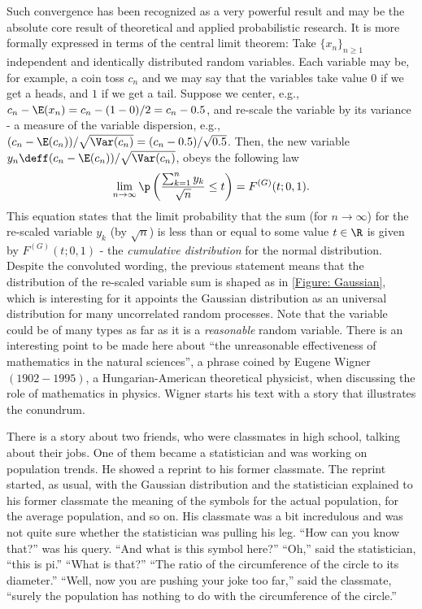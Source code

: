 Such convergence has been recognized as a very powerful result and may be the absolute core result of theoretical and applied probabilistic research. It is more formally expressed in terms of the central limit theorem: Take $\{x_n\}_{n\geq1}$ independent and identically distributed random variables. Each variable may be, for example, a coin toss $c_n$ and we may say that the variables take value $0$ if we get a heads, and $1$ if we get a tail. Suppose we center, e.g., $c_n - \E(x_n) = c_n - (1-0)/2 = c_n - 0.5$, and re-scale the variable by its variance - a measure of the variable dispersion, e.g.,  $(c_n - \E(c_n)) / \sqrt{\Var(c_n)} = (c_n - 0.5)/ \sqrt{0.5}$. Then, the new variable $y_n \deff (c_n - \E(c_n)) / \sqrt{\Var(c_n)}$, obeys the following law
\begin{equation}
	\lim_{n\rightarrow \infty} \p\left( \frac{\sum_{k=1}^{n} y_k}{\sqrt{n}} \leq t \right) =F^{(G)}(t; 0, 1).
\end{equation}
This equation states that the limit probability that the sum (for $n \rightarrow \infty$) for the re-scaled variable $y_k$ (by $\sqrt{n}$) is less than or equal to some value $t \in \R$ is given by $F^{(G)}(t; 0, 1)$ - the \textit{cumulative distribution} for the normal distribution. Despite the convoluted wording, the previous statement means that the distribution of the re-scaled variable sum is shaped as in \autoref{Figure: Gaussian}, which is interesting for it appoints the Gaussian distribution as an universal distribution for many uncorrelated random processes. Note that the variable could be of many types as far as it is a \textit{reasonable} random variable. There is an interesting point to be made here about \enquote{the unreasonable effectiveness of mathematics in the natural sciences}, a phrase coined by Eugene Wigner $(1902-1995)$, a Hungarian-American theoretical physicist, when discussing the role of mathematics in physics. Wigner starts his text with a story that illustrates the conundrum.

\begin{citacao}
	There is a story about two friends, who were classmates in high school, talking about their jobs. One of them became a statistician and was working on population trends. He showed a reprint to his former classmate. The reprint started, as usual, with the Gaussian distribution and the statistician explained to his former classmate the meaning of the symbols for the actual population, for the average population, and so on. His classmate was a bit incredulous and was not quite sure whether the statistician was pulling his leg. \enquote{How can you know that?} was his query. \enquote{And what is this symbol here?} \enquote{Oh,} said the statistician, \enquote{this is pi.} \enquote{What is that?} \enquote{The ratio of the circumference of the circle to its diameter.} \enquote{Well, now you are pushing your joke too far,} said the	classmate, \enquote{surely the population has nothing to do with the circumference of the circle.} \cite{Wigner1995}
\end{citacao}

